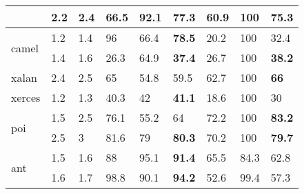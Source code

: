 \begin{table}[!b]
\begin{tabular}{l|ll|lll|lll}
                         & 2.2                    & 2.4                             & 66.5 & 92.1 & \cellcolor{blue!10}\textbf{77.3}           & 60.9 & 100  & \cellcolor{blue!10}\textbf{75.3}              \\ \midrule
\multirow{2}{*}{camel}   & 1.2                    & 1.4                           & 96   & 66.4 & \cellcolor{blue!10}\textbf{78.5}           & 20.2 & 100  & 32.4              \\
                         & 1.4                    & 1.6                                  & 26.3 & 64.9 & \cellcolor{blue!10}\textbf{37.4}           & 26.7 & 100  & \cellcolor{blue!10}\textbf{38.2}              \\ \midrule
xalan                    & 2.4                    & 2.5                                  & 65   & 54.8 & 59.5           & 62.7 & 100  & \cellcolor{blue!10}\textbf{66}                \\ \midrule
xerces                   & 1.2                    & 1.3                               & 40.3 & 42   & \cellcolor{blue!10}\textbf{41.1}           & 18.6 & 100  & 30                \\ \midrule
\multirow{2}{*}{poi}     & 1.5                    & 2.5                                & 76.1 & 55.2 & 64             & 72.2 & 100  & \cellcolor{blue!10}\textbf{83.2}              \\
                         & 2.5                    & 3                                     & 81.6 & 79   & \cellcolor{blue!10}\textbf{80.3}           & 70.2 & 100  & \cellcolor{blue!10}\textbf{79.7}              \\ \midrule
\multirow{2}{*}{ant}     & 1.5                    & 1.6                                  & 88   & 95.1 & \cellcolor{blue!10}\textbf{91.4}           & 65.5 & 84.3 & 62.8              \\
                         & 1.6                    & 1.7                                  & 98.8 & 90.1 & \cellcolor{blue!10}\textbf{94.2}           & 52.6 & 99.4 & 57.3              \\
 \bottomrule
\end{tabular}
\end{table}